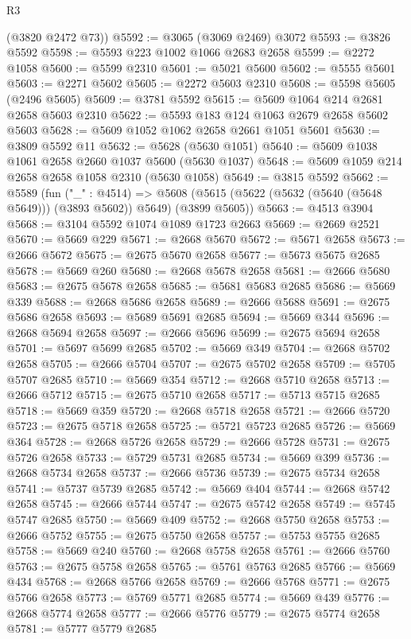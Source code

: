 \begin{lexlean}{R3}
\begin{coremodule}
      (@3820 @2472 @73))
@5592 := @3065 (@3069 @2469) @3072
@5593 := @3826 @5592
@5598 := @5593 @223 @1002 @1066 @2683 @2658
@5599 := @2272 @1058
@5600 := @5599 @2310
@5601 := @5021 @5600
@5602 := @5555 @5601
@5603 := @2271 @5602
@5605 := @2272 @5603 @2310
@5608 := @5598 @5605 (@2496 @5605)
@5609 := @3781 @5592
@5615 := @5609 @1064 @214 @2681 @2658 @5603 @2310
@5622 := @5593 @183 @124 @1063 @2679 @2658 @5602 @5603
@5628 := @5609 @1052 @1062 @2658 @2661 @1051 @5601
@5630 := @3809 @5592 @11
@5632 := @5628 (@5630 @1051)
@5640 := @5609 @1038 @1061 @2658 @2660 @1037 @5600 (@5630 @1037)
@5648 := @5609 @1059 @214 @2658 @2658 @1058 @2310 (@5630 @1058)
@5649 := @3815 @5592
@5662 := @5589
    (fun ("_" : @4514) =>
    @5608 (@5615 (@5622 (@5632 (@5640 (@5648 @5649))) (@3893 @5602)) @5649) (@3899 @5605))
@5663 := @4513 @3904
@5668 := @3104 @5592 @1074 @1089 @1723 @2663
@5669 := @2669 @2521
@5670 := @5669 @229
@5671 := @2668 @5670
@5672 := @5671 @2658
@5673 := @2666 @5672
@5675 := @2675 @5670 @2658
@5677 := @5673 @5675 @2685
@5678 := @5669 @260
@5680 := @2668 @5678 @2658
@5681 := @2666 @5680
@5683 := @2675 @5678 @2658
@5685 := @5681 @5683 @2685
@5686 := @5669 @339
@5688 := @2668 @5686 @2658
@5689 := @2666 @5688
@5691 := @2675 @5686 @2658
@5693 := @5689 @5691 @2685
@5694 := @5669 @344
@5696 := @2668 @5694 @2658
@5697 := @2666 @5696
@5699 := @2675 @5694 @2658
@5701 := @5697 @5699 @2685
@5702 := @5669 @349
@5704 := @2668 @5702 @2658
@5705 := @2666 @5704
@5707 := @2675 @5702 @2658
@5709 := @5705 @5707 @2685
@5710 := @5669 @354
@5712 := @2668 @5710 @2658
@5713 := @2666 @5712
@5715 := @2675 @5710 @2658
@5717 := @5713 @5715 @2685
@5718 := @5669 @359
@5720 := @2668 @5718 @2658
@5721 := @2666 @5720
@5723 := @2675 @5718 @2658
@5725 := @5721 @5723 @2685
@5726 := @5669 @364
@5728 := @2668 @5726 @2658
@5729 := @2666 @5728
@5731 := @2675 @5726 @2658
@5733 := @5729 @5731 @2685
@5734 := @5669 @399
@5736 := @2668 @5734 @2658
@5737 := @2666 @5736
@5739 := @2675 @5734 @2658
@5741 := @5737 @5739 @2685
@5742 := @5669 @404
@5744 := @2668 @5742 @2658
@5745 := @2666 @5744
@5747 := @2675 @5742 @2658
@5749 := @5745 @5747 @2685
@5750 := @5669 @409
@5752 := @2668 @5750 @2658
@5753 := @2666 @5752
@5755 := @2675 @5750 @2658
@5757 := @5753 @5755 @2685
@5758 := @5669 @240
@5760 := @2668 @5758 @2658
@5761 := @2666 @5760
@5763 := @2675 @5758 @2658
@5765 := @5761 @5763 @2685
@5766 := @5669 @434
@5768 := @2668 @5766 @2658
@5769 := @2666 @5768
@5771 := @2675 @5766 @2658
@5773 := @5769 @5771 @2685
@5774 := @5669 @439
@5776 := @2668 @5774 @2658
@5777 := @2666 @5776
@5779 := @2675 @5774 @2658
@5781 := @5777 @5779 @2685

\end{coremodule}
\end{lexlean}
